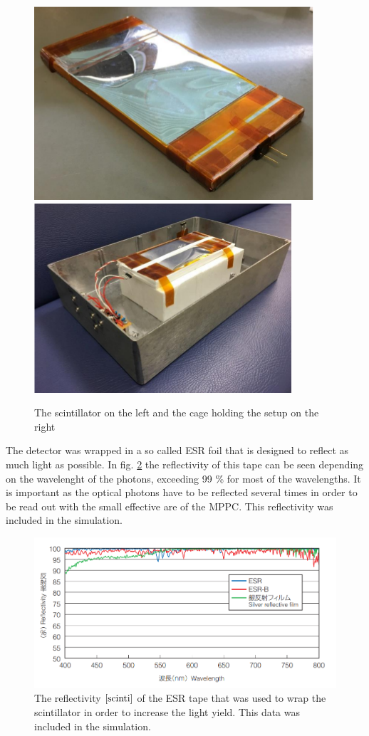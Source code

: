\documentclass[12pt, a4paper,titlepage]{article}
\numberwithin{equation}{section}
\numberwithin{figure}{section}
\begin{document}
\begin{figure}[htbp]
 \centering %
 \includegraphics[width=.4\textwidth,origin=c,angle=0]{images/1channelsetup.png}
 \qquad
 \includegraphics[width=.4\textwidth,origin=c,angle=0]{images/1channelsetupbox.png} 
 \caption{\label{fig:i} The scintillator on the left and the cage holding the setup on the right}
 \end{figure}

The detector was wrapped in a so called ESR foil that is designed to reflect as much light as possible. In fig. \ref{fig:refl} the reflectivity of this tape can be seen depending on the wavelenght of the photons, exceeding 99 \% for most of the wavelengths. It is important as the optical photons have to be reflected several times in order to be read out with the small effective are of the MPPC. This reflectivity was included in the simulation.


\begin{figure}[H]
\centering
\includegraphics[width=130.0mm]{images/reflectivity.png}
\caption{The reflectivity $\cite{scinti}$ of the ESR tape that was used to wrap the scintillator in order to increase the light yield. This data was included in the simulation.}
\label{fig:refl}
\end{figure}
\end{document}
